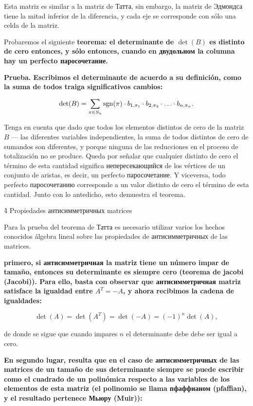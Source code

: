 Esta matriz es similar a la matriz de Татта, sin embargo, la matriz de Эдмондса tiene la mitad inferior de la diferencia, y cada eje se corresponde con sólo una celda de la matriz.

Probaremos el siguiente \bf{teorema}: el determinante de $\det(B)$ es distinto de cero entonces, y sólo entonces, cuando en двудольном la columna hay un perfecto паросочетание.

\bf{Prueba}. Escribimos el determinante de acuerdo a su definición, como la suma de todos traiga significativos cambios:

$$ \det(B) = \sum_{\pi \in S_n} {\rm sgn}(\pi) \cdot b_{1,\pi_1} \cdot b_{2,\pi_2} \cdot \ldots \cdot b_{n,\pi_n}. $$

Tenga en cuenta que dado que todos los elementos distintos de cero de la matriz $B$ --- las diferentes variables independientes, la suma de todos distintos de cero de sumandos son diferentes, y porque ninguna de las reducciones en el proceso de totalización no se produce. Queda por señalar que cualquier distinto de cero el término de esta cantidad significa непересекающийся de los vértices de un conjunto de aristas, es decir, un perfecto паросочетание. Y viceversa, todo perfecto паросочетанию corresponde a un valor distinto de cero el término de esta cantidad. Junto con lo antedicho, esto demuestra el teorema.


\h4{ Propiedades антисимметричных matrices }

Para la prueba del teorema de Татта es necesario utilizar varios los hechos conocidos álgebra lineal sobre las propiedades de антисимметричных de las matrices.

\bf{primero}, si антисимметричная la matriz tiene un número impar de tamaño, entonces su determinante es siempre cero (teorema de jacobi (Jacobi)). Para ello, basta con observar que антисимметричная matriz satisface la igualdad entre $A^T = -A$, y ahora recibimos la cadena de igualdades:

$$ \det(A) = \det(A^T) = \det(-A) = (-1)^n \det(A), $$

de donde se sigue que cuando impares $n$ el determinante debe debe ser igual a cero.

\bf{En segundo lugar}, resulta que en el caso de антисимметричных de las matrices de un tamaño de sus determinante siempre se puede escribir como el cuadrado de un polinómica respecto a las variables de los elementos de esta matriz (el polinomio se llama пфаффианом (pfaffian), y el resultado pertenece Мьюру (Muir)):


